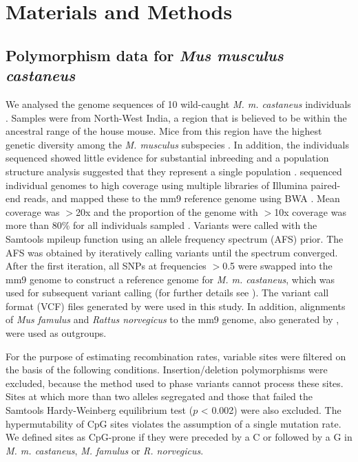 \section{Materials and Methods}
 
\subsection{Polymorphism data for \textit{Mus musculus castaneus}}
 
We analysed the genome sequences of 10 wild-caught \textit{M. m. castaneus} individuals \citep{RN122}. Samples were from North-West India, a region that is believed to be within the ancestral range of the house mouse. Mice from this region have the highest genetic diversity among the \textit{M. musculus} subspecies \citep{RN233}. In addition, the individuals sequenced showed little evidence for substantial inbreeding and a population structure analysis suggested that they represent a single population \citep{RN158}. \cite{RN122} sequenced individual genomes to high coverage using multiple libraries of Illumina paired-end reads, and mapped these to the mm9 reference genome using BWA \citep{RN251}. Mean coverage was $>$20x and the proportion of the genome with $>$10x coverage was more than 80\% for all individuals sampled \citep{RN122}. Variants were called with the Samtools mpileup function \citep{RN252} using an allele frequency spectrum (AFS) prior. The AFS was obtained by iteratively calling variants until the spectrum converged. After the first iteration, all SNPs at frequencies $>$0.5 were swapped into the mm9 genome to construct a reference genome for \textit{M. m. castaneus}, which was used for subsequent variant calling (for further details see \citealt{RN122}). The variant call format (VCF) files generated by \cite{RN122} were used in this study. In addition, alignments of \textit{Mus famulus} and \textit{Rattus norvegicus} to the mm9 genome, also generated by \cite{RN122}, were used as outgroups.
 
	For the purpose of estimating recombination rates, variable sites were filtered on the basis of the following conditions. Insertion/deletion polymorphisms were excluded, because the method used to phase variants cannot process these sites. Sites at which more than two alleles segregated and those that failed the Samtools Hardy-Weinberg equilibrium test ($p$ < 0.002) were also excluded. The hypermutability of CpG sites violates the assumption of a single mutation rate. We defined sites as CpG-prone if they were preceded by a C or followed by a G in \textit{M. m. castaneus}, \textit{M. famulus} or \textit{R. norvegicus}. 
 
